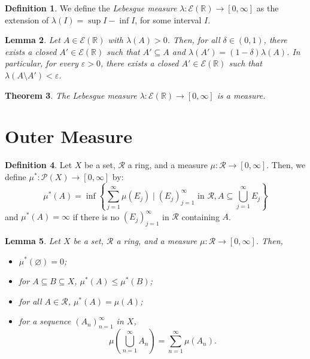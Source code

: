 \documentclass[a4paper, openany]{memoir}
\theoremstyle{definition}
\newtheorem{definition}{Definition}[section]
\theoremstyle{plain}
\newtheorem{theorem}[definition]{Theorem}
\newtheorem{lemma}[definition]{Lemma}
\begin{document}
    \begin{definition}
        We define the \emph{Lebesgue measure} $\lambda \colon \mathcal{E}(\mathbb{R}) \to [0, \infty]$ as the extension of $\lambda(I) = \sup I - \inf I$, for some interval $I$.
    \end{definition}

    \begin{lemma}
        Let $A \in \mathcal{E}(\mathbb{R})$ with $\lambda(A) > 0$. Then, for all $\delta \in (0, 1)$, there exists a closed $A' \in \mathcal{E}(\mathbb{R})$ such that $A' \subseteq A$ and $\lambda(A') = (1 - \delta ) \lambda(A)$. In particular, for every $\varepsilon > 0$, there exists a closed $A' \in \mathcal{E}(\mathbb{R})$ such that $\lambda(A \setminus A') < \varepsilon$.
    \end{lemma}

    \begin{theorem}
        The Lebesgue measure $\lambda \colon \mathcal{E}(\mathbb{R}) \to [0, \infty]$ is a measure.
    \end{theorem}
    \newpage

    \section{Outer Measure}
    \begin{definition}
        Let $X$ be a set, $\mathcal{R}$ a ring, and a measure $\mu \colon \mathcal{R} \to [0, \infty]$. Then, we define $\mu^* \colon \mathcal{P}(X) \to [0, \infty]$ by:
        \[\mu^*(A) = \inf \left\{\sum_{j=1}^\infty \mu(E_j) \mid (E_j)_{j=1}^\infty \text{ in } \mathcal{R}, A \subseteq \bigcup_{j=1}^\infty E_j\right\}\]
        and $\mu^*(A) = \infty$ if there is no $(E_j)_{j=1}^\infty$ in $\mathcal{R}$ containing $A$.
    \end{definition}

    \begin{lemma}
        Let $X$ be a set, $\mathcal{R}$ a ring, and a measure $\mu \colon \mathcal{R} \to [0, \infty]$. Then,
        \begin{itemize}
            \item $\mu^*(\varnothing) = 0$;
            \item for $A \subseteq B \subseteq X$, $\mu^*(A) \leq \mu^*(B)$;
            \item for all $A \in \mathcal{R}$, $\mu^*(A) = \mu(A)$;
            \item for a sequence $(A_n)_{n=1}^\infty$ in $X$,
            \[\mu \left(\bigcup_{n=1}^\infty A_n\right) = \sum_{n=1}^\infty \mu(A_n).\]
        \end{itemize}
    \end{lemma}
\end{document}
